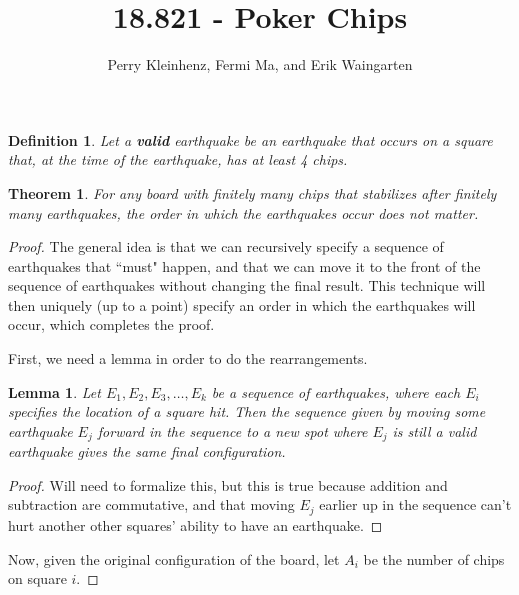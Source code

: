 \documentclass[11pt]{article}
\author{Perry Kleinhenz, Fermi Ma, and Erik Waingarten}
\title{18.821 - Poker Chips}
\newtheorem{theorem}{Theorem}
\newtheorem{lemma}{Lemma}
\newtheorem{definition}{Definition}
\begin{document}
         
\maketitle

\begin{definition}
Let a \textbf{valid} earthquake be an earthquake that occurs on a square that, at the time of the earthquake, has at least 4 chips.
\end{definition}
\begin{theorem}
For any board with finitely many chips that stabilizes after finitely many earthquakes, the order in which the earthquakes occur does not matter.
\end{theorem}
\begin{proof}
The general idea is that we can recursively specify a sequence of earthquakes that ``must" happen, and that we can move it to the front of the sequence of earthquakes without changing the final result. This technique will then uniquely (up to a point) specify an order in which the earthquakes will occur, which completes the proof.

First, we need a lemma in order to do the rearrangements.

\begin{lemma}
Let $E_1,E_2,E_3,\dots, E_k$ be a sequence of earthquakes, where each $E_i$ specifies the location of a square hit. Then the sequence given by moving some earthquake $E_j$ forward in the sequence to a new spot where $E_j$ is still a valid earthquake gives the same final configuration.
\end{lemma}
\begin{proof}
Will need to formalize this, but this is true because addition and subtraction are commutative, and that moving $E_j$ earlier up in the sequence can't hurt another other squares' ability to have an earthquake.
\end{proof}

Now, given the original configuration of the board, let $A_i$ be the number of chips on square $i$.

\end{proof}
\end{document}
